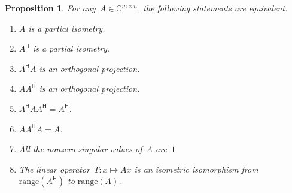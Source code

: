 \documentclass[11pt,a4paper]{article}  %
\numberwithin{equation}{section}
\newtheorem{proposition}{Proposition}%
\theoremstyle{definition}
\def\CC{\mathbb{C}}
\newcommand{\hmt}{{\scriptscriptstyle{{\mathsf{H}}}}}
\newcommand{\range}{\mathrm{range}}
\begin{document}
\begin{proposition}
  \label{prop:piso}
  For any~$A\in\CC^{m\times n}$, the following statements are equivalent.
  \begin{enumerate}[leftmargin=1.5em]
    \item \label{it:ai} $A$ is a partial isometry.
    \item \label{it:ahi} $A^\hmt$ is a partial isometry.
    \item \label{it:aha} $A^\hmt A$ is an orthogonal projection.
    \item \label{it:aah} $AA^\hmt$ is an orthogonal projection.
    \item \label{it:ahaah} $A^\hmt A A^\hmt = A^\hmt$.
    \item \label{it:aaha} $A A^\hmt A = A$.
    \item \label{it:sina} All the nonzero singular values of~$A$ are~$1$.
    \item \label{it:iso} The linear operator~$T\mathrel{:} x \mapsto Ax$ is an isometric isomorphism from~$\range(A^\hmt)$ to $\range(A)$.
  \end{enumerate}
\end{proposition}
\end{document}

